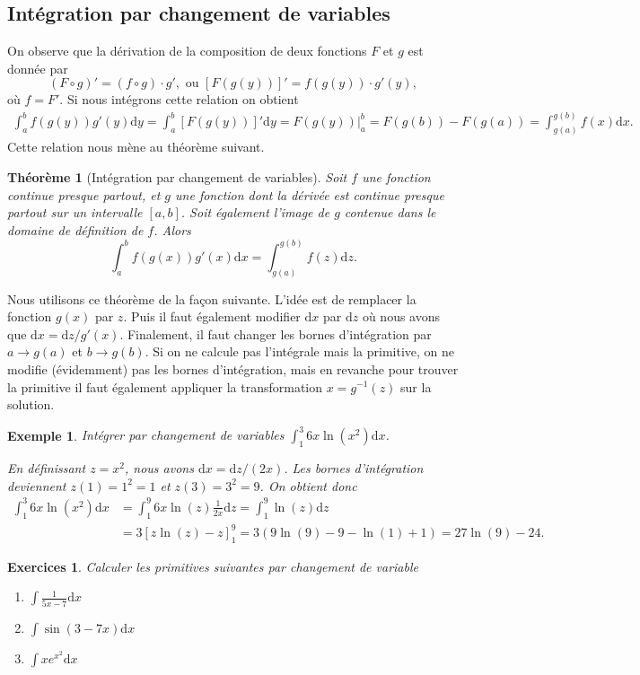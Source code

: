 \documentclass[a4paper,12pt]{book}
\newcommand{\dd}{\mathrm{d}}
\newtheorem*{exemple}{Exemple}
\newtheorem*{exercices}{Exercices}
\newtheorem{theoreme}{Théorème}
\begin{document}
\subsection{Intégration par changement de variables}

On observe que la dérivation de la composition de deux fonctions $F$ et $g$ est donnée par
\begin{equation}
 (F\circ g)'=(f\circ g)\cdot g',\mbox{ ou } [F(g(y))]'=f(g(y))\cdot g'(y),
\end{equation}
où $f=F'$. Si nous intégrons cette relation on obtient
\begin{align*}
 \int_a^b f(g(y))g'(y)\dd y = \int_a^b [F(g(y))]'\dd y=\left.F(g(y))\right|_a^b=F(g(b))-F(g(a))=\int_{g(a)}^{g(b)}f(x)\dd x.
\end{align*}
Cette relation nous mène au théorème suivant.
\begin{theoreme}[Intégration par changement de variables]
Soit $f$ une fonction continue presque partout, et $g$ une fonction dont la dérivée est continue presque partout sur un intervalle 
$[a,b]$. Soit également l'image de $g$ contenue dans le domaine de définition de $f$. Alors
\begin{equation}
 \int_a^b f(g(x))g'(x)\dd x = \int_{g(a)}^{g(b)}f(z)\dd z.
\end{equation}
\end{theoreme}
Nous utilisons ce théorème de la façon suivante. L'idée est de remplacer la fonction $g(x)$ par $z$. Puis il faut également
modifier $\dd x$ par $\dd z$ où nous avons que $\dd x=\dd z/g'(x)$. Finalement, il faut changer les bornes d'intégration 
par $a\rightarrow g(a)$ et $b\rightarrow g(b)$. Si on ne calcule pas l'intégrale mais la primitive, on ne modifie (évidemment) pas
les bornes d'intégration, mais en revanche pour trouver la primitive il faut également appliquer la transformation
$x=g^{-1}(z)$ sur la solution.
\begin{exemple}
 Intégrer par changement de variables $\int_1^3 6x\ln(x^2)\dd x$.
 
 En définissant $z=x^2$, nous avons $\dd x=\dd z/(2x)$. Les bornes d'intégration deviennent $z(1)=1^2=1$ et $z(3)=3^2=9$.
 On obtient donc
 \begin{align*}
  \int_1^3 6x\ln(x^2)\dd x&=\int_1^9 6x\ln(z)\frac{1}{2x}\dd z=\int_1^9\ln(z)\dd z\nonumber\\
                          &=3\left[z\ln(z)-z\right]_1^9=3(9\ln(9)-9-\ln(1)+1)=27\ln(9)-24.
 \end{align*}

\end{exemple}
\begin{exercices}
Calculer les primitives suivantes par changement de variable
 \begin{enumerate}
  \item $\int \frac{1}{5x-7}\dd x$
  \item $\int \sin(3-7x)\dd x$
  \item $\int x e^{x^2}\dd x$
 \end{enumerate}

\end{exercices}
\end{document}
